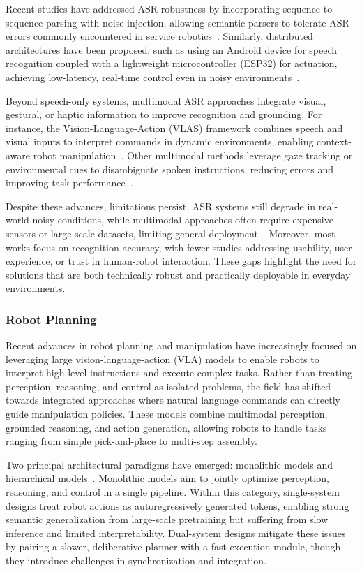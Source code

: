 \documentclass[12pt]{extarticle}
\begin{document}
Recent studies have addressed ASR robustness by incorporating sequence-to-sequence parsing with noise injection, allowing semantic parsers to tolerate ASR errors commonly encountered in service robotics~\cite{tada2020robust}. Similarly, distributed architectures have been proposed, such as using an Android device for speech recognition coupled with a lightweight microcontroller (ESP32) for actuation, achieving low-latency, real-time control even in noisy environments~\cite{gupta2025speech}.

Beyond speech-only systems, multimodal ASR approaches integrate visual, gestural, or haptic information to improve recognition and grounding. For instance, the Vision-Language-Action (VLAS) framework combines speech and visual inputs to interpret commands in dynamic environments, enabling context-aware robot manipulation~\cite{yu2020vlas}. Other multimodal methods leverage gaze tracking or environmental cues to disambiguate spoken instructions, reducing errors and improving task performance~\cite{liu2021multimodal}.

Despite these advances, limitations persist. ASR systems still degrade in real-world noisy conditions, while multimodal approaches often require expensive sensors or large-scale datasets, limiting general deployment~\cite{liu2021multimodal}. Moreover, most works focus on recognition accuracy, with fewer studies addressing usability, user experience, or trust in human-robot interaction. These gaps highlight the need for solutions that are both technically robust and practically deployable in everyday environments.



\subsubsection{Robot Planning}

Recent advances in robot planning and manipulation have increasingly focused on leveraging large vision-language-action (VLA) models to enable robots to interpret high-level instructions and execute complex tasks. Rather than treating perception, reasoning, and control as isolated problems, the field has shifted towards integrated approaches where natural language commands can directly guide manipulation policies. These models combine multimodal perception, grounded reasoning, and action generation, allowing robots to handle tasks ranging from simple pick-and-place to multi-step assembly.

Two principal architectural paradigms have emerged: monolithic models and hierarchical models~\cite{vla-in-robot}. Monolithic models aim to jointly optimize perception, reasoning, and control in a single pipeline. Within this category, single-system designs treat robot actions as autoregressively generated tokens, enabling strong semantic generalization from large-scale pretraining but suffering from slow inference and limited interpretability. Dual-system designs mitigate these issues by pairing a slower, deliberative planner with a fast execution module, though they introduce challenges in synchronization and integration.
\end{document}
